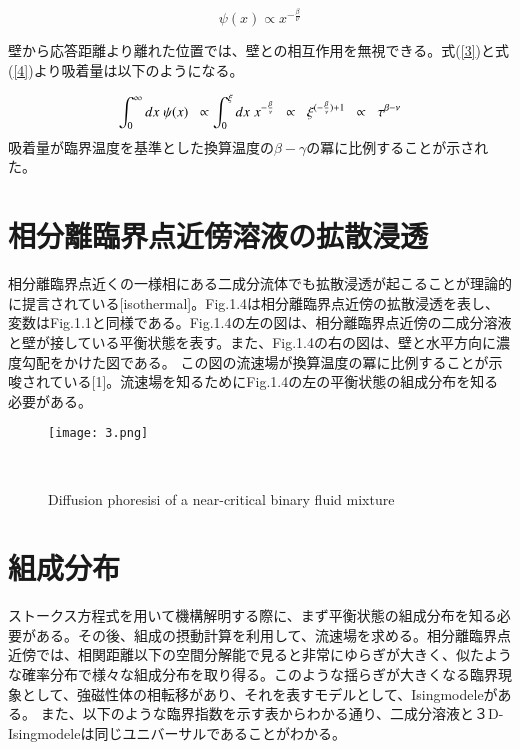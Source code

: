 \documentclass[a4paper,12pt, oneside, openany]{jsbook}
\begin{document}
\begin{equation}\label{4}
\psi(x)\propto x^{-\frac{\beta}{\nu}}
\end{equation}


\noindent 壁から応答距離より離れた位置では、壁との相互作用を無視できる。式(\ref{3})と式(\ref{4})より吸着量は以下のようになる。

\begin{equation}\label{5}
\int_{0}^{\infty}dx \hspace{1mm}\psi(x) \hspace{2mm} \propto  \int_{0}^{\xi} dx \hspace{1mm} x^{-\frac{\beta}{\nu}}  \hspace{2mm} \propto  \hspace{2mm}\xi^{(-\frac{\beta}{\nu})+1} \hspace{2mm} \propto \hspace{2mm}\tau^{\beta-\nu}
\end{equation}
\noindent
吸着量が臨界温度を基準とした換算温度の$\beta-\gamma$の冪に比例することが示された。

\section{相分離臨界点近傍溶液の拡散浸透}
相分離臨界点近くの一様相にある二成分流体でも拡散浸透が起こることが理論的に提言されている[isothermal]。Fig.1.4は相分離臨界点近傍の拡散浸透を表し、変数はFig.1.1と同様である。Fig.1.4の左の図は、相分離臨界点近傍の二成分溶液と壁が接している平衡状態を表す。また、Fig.1.4の右の図は、壁と水平方向に濃度勾配をかけた図である。
この図の流速場が換算温度の冪に比例することが示唆されている[1]。流速場を知るためにFig.1.4の左の平衡状態の組成分布を知る必要がある。
\begin{figure}[!htbp]
\label{Fig.2}
\texttt{[image: 3.png]}
\vspace*{-0.4cm}
\centering  %
\begin{spacing}{0.8}　%
\caption{Diffusion phoresisi of a near-critical binary fluid mixture}
\end{spacing}
\end{figure}


\newpage



\section{組成分布}

ストークス方程式を用いて機構解明する際に、まず平衡状態の組成分布を知る必要がある。その後、組成の摂動計算を利用して、流速場を求める。相分離臨界点近傍では、相関距離以下の空間分解能で見ると非常にゆらぎが大きく、似たような確率分布で様々な組成分布を取り得る。このような揺らぎが大きくなる臨界現象として、強磁性体の相転移があり、それを表すモデルとして、Isingmodeleがある。
また、以下のような臨界指数を示す表からわかる通り、二成分溶液と３D-Isingmodeleは同じユニバーサルであることがわかる。
\end{document}
